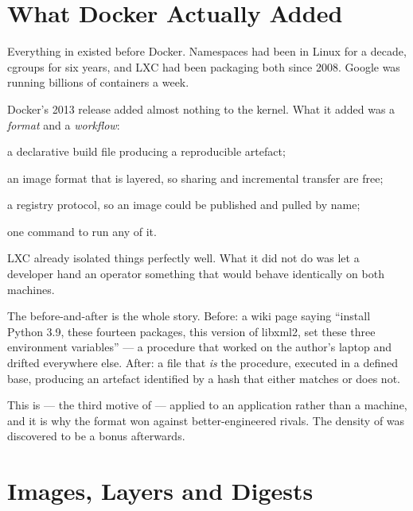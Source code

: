 \section{What Docker Actually Added}

Everything in  existed before Docker. Namespaces had been in
Linux for a decade, cgroups for six years, and LXC had been packaging both
since 2008. Google was running billions of containers a week.

Docker's 2013 release added almost nothing to the kernel. What it added was a
\emph{format} and a \emph{workflow}:

\begin{tight}
  \item a declarative build file producing a reproducible artefact;
  \item an image format that is layered, so sharing and incremental transfer
        are free;
  \item a registry protocol, so an image could be published and pulled by
        name;
  \item one command to run any of it.
\end{tight}

\begin{conceptbox}
LXC already isolated things perfectly well. What it did not do was let a
developer hand an operator something that would behave identically on both
machines.

\smallskip
The before-and-after is the whole story. Before: a wiki page saying ``install
Python 3.9, these fourteen packages, this version of libxml2, set these three
environment variables'' --- a procedure that worked on the author's laptop and
drifted everywhere else. After: a file that \emph{is} the procedure, executed
in a defined base, producing an artefact identified by a hash that either
matches or does not.

\smallskip
This is  --- the third motive of  --- applied
to an application rather than a machine, and it is why the format won against
better-engineered rivals. The density of  was discovered to
be a bonus afterwards.
\end{conceptbox}

\section{Images, Layers and Digests}

